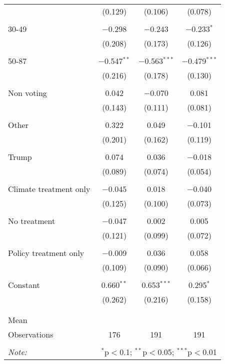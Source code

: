 \begin{tabular}{@{\extracolsep{5pt}}lccc}
  & (0.129) & (0.106) & (0.078) \\ 
  & & & \\ 
 30-49 & $-$0.298 & $-$0.243 & $-$0.233$^{*}$ \\ 
  & (0.208) & (0.173) & (0.126) \\ 
  & & & \\ 
 50-87 & $-$0.547$^{**}$ & $-$0.563$^{***}$ & $-$0.479$^{***}$ \\ 
  & (0.216) & (0.178) & (0.130) \\ 
  & & & \\ 
 Non voting & 0.042 & $-$0.070 & 0.081 \\ 
  & (0.143) & (0.111) & (0.081) \\ 
  & & & \\ 
 Other & 0.322 & 0.049 & $-$0.101 \\ 
  & (0.201) & (0.162) & (0.119) \\ 
  & & & \\ 
 Trump & 0.074 & 0.036 & $-$0.018 \\ 
  & (0.089) & (0.074) & (0.054) \\ 
  & & & \\ 
 Climate treatment only & $-$0.045 & 0.018 & $-$0.040 \\ 
  & (0.125) & (0.100) & (0.073) \\ 
  & & & \\ 
 No treatment & $-$0.047 & 0.002 & 0.005 \\ 
  & (0.121) & (0.099) & (0.072) \\ 
  & & & \\ 
 Policy treatment only & $-$0.009 & 0.036 & 0.058 \\ 
  & (0.109) & (0.090) & (0.066) \\ 
  & & & \\ 
 Constant & 0.660$^{**}$ & 0.653$^{***}$ & 0.295$^{*}$ \\ 
  & (0.262) & (0.216) & (0.158) \\ 
  & & & \\ 
\hline \\[-1.8ex] 
Mean &  &  &  \\ 
Observations & 176 & 191 & 191 \\ 
\hline 
\hline \\[-1.8ex] 
\textit{Note:}  & \multicolumn{3}{r}{$^{*}$p$<$0.1; $^{**}$p$<$0.05; $^{***}$p$<$0.01} \\ 
\end{tabular} 
